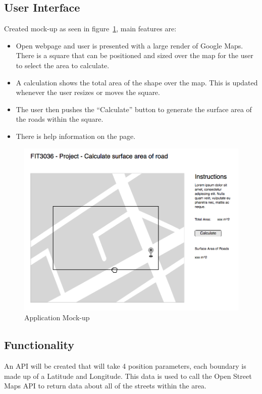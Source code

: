 \documentclass[a4paper,11pt]{article}
\begin{document}
\subsection{User Interface}

Created mock-up as seen in figure~\ref{fig:mockup}, main features are:

\begin{itemize}
  \item Open webpage and user is presented with a large render of Google Maps.
    There is a square that can be positioned and sized over the map for the user
    to select the area to calculate.
  \item A calculation shows the total area of the shape over the map. This is
    updated whenever the user resizes or moves the square.
  \item The user then pushes the ``Calculate'' button to generate the surface
    area of the roads within the square.
  \item There is help information on the page.
\end{itemize}

\begin{figure}[H]
  \includegraphics[width=\textwidth]{UI-mockup}
  \caption{Application Mock-up}\label{fig:mockup}
\end{figure}

\subsection{Functionality}

An API will be created that will take 4 position parameters, each boundary is
made up of a Latitude and Longitude. This data is used to call the  Open Street
Maps API to return data about all of the streets within the area.
\end{document}
